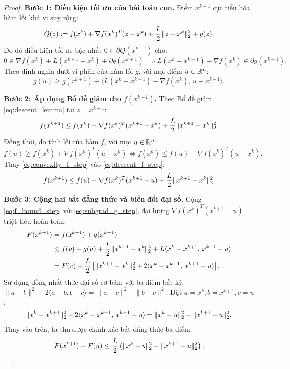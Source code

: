 \begin{proof}
\textbf{Bước 1: Điều kiện tối ưu của bài toán con.}
Điểm $x^{k+1}$ cực tiểu hóa hàm lồi khả vi suy rộng:
\[
Q(z) \mathrel{\mathop:}= f(x^k) + \nabla f(x^k)^T(z - x^k) + \frac{L}{2} \|z - x^k\|_2^2 + g(z).
\]
Do đó điều kiện tối ưu bậc nhất $0 \in \partial Q(x^{k+1})$ cho:
\[
0 \in \nabla f(x^k) + L(x^{k+1} - x^k) + \partial g(x^{k+1}) \implies L(x^k - x^{k+1}) - \nabla f(x^k) \in \partial g(x^{k+1}).
\]
Theo định nghĩa dưới vi phân của hàm lồi $g$, với mọi điểm $u \in \mathbb{R}^n$:
\begin{equation}
    g(u) \ge g(x^{k+1}) + \langle L(x^k - x^{k+1}) - \nabla f(x^k), \, u - x^{k+1} \rangle.
    \label{eq:subgrad_g_step}
\end{equation}

\textbf{Bước 2: Áp dụng Bổ đề giảm cho $f(x^{k+1})$.}
Theo Bổ đề giảm \eqref{eq:descent_lemma} tại $z = x^{k+1}$:
\begin{equation}
    f(x^{k+1}) \le f(x^k) + \nabla f(x^k)^T(x^{k+1} - x^k) + \frac{L}{2} \|x^{k+1} - x^k\|_2^2.
    \label{eq:descent_f_step}
\end{equation}
Đồng thời, do tính lồi của hàm $f$, với mọi $u \in \mathbb{R}^n$:
\begin{equation}
    f(u) \ge f(x^k) + \nabla f(x^k)^T(u - x^k) \iff f(x^k) \le f(u) - \nabla f(x^k)^T(u - x^k).
    \label{eq:convexity_f_step}
\end{equation}
Thay \eqref{eq:convexity_f_step} vào \eqref{eq:descent_f_step}:
\begin{equation}
    f(x^{k+1}) \le f(u) + \nabla f(x^k)^T(x^{k+1} - u) + \frac{L}{2} \|x^{k+1} - x^k\|_2^2.
    \label{eq:f_bound_step}
\end{equation}

\textbf{Bước 3: Cộng hai bất đẳng thức và biến đổi đại số.}
Cộng \eqref{eq:f_bound_step} với \eqref{eq:subgrad_g_step}, đại lượng $\nabla f(x^k)^T(x^{k+1} - u)$ triệt tiêu hoàn toàn:
\begin{align*}
    F(x^{k+1}) &= f(x^{k+1}) + g(x^{k+1}) \\
    &\le f(u) + g(u) + \frac{L}{2} \|x^{k+1} - x^k\|_2^2 + L \langle x^k - x^{k+1}, \, x^{k+1} - u \rangle \\
    &= F(u) + \frac{L}{2} \left[ \|x^{k+1} - x^k\|_2^2 + 2 \langle x^k - x^{k+1}, \, x^{k+1} - u \rangle \right].
\end{align*}
Sử dụng đồng nhất thức đại số cơ bản: với ba điểm bất kỳ, $\|a - b\|^2 + 2\langle a - b, b - c \rangle = \|a - c\|^2 - \|b - c\|^2$. Đặt $a = x^k, b = x^{k+1}, c = u$:
\[
\|x^k - x^{k+1}\|_2^2 + 2 \langle x^k - x^{k+1}, \, x^{k+1} - u \rangle = \|x^k - u\|_2^2 - \|x^{k+1} - u\|_2^2.
\]
Thay vào trên, ta thu được chính xác bất đẳng thức ba điểm:
\[
F(x^{k+1}) - F(u) \le \frac{L}{2} \left( \|x^k - u\|_2^2 - \|x^{k+1} - u\|_2^2 \right).
\]


\end{proof}
